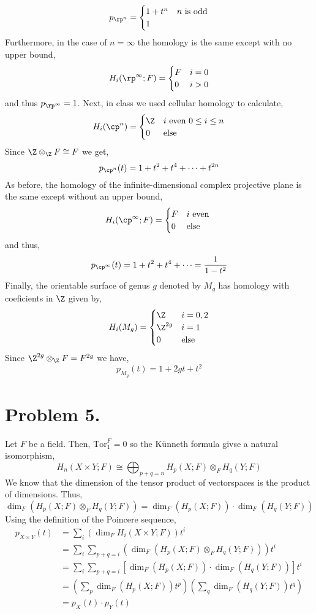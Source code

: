 \documentclass[12pt]{extarticle}
\begin{document}
\[ p_{\rp^n} = 
\begin{cases}
1 + t^n & n \text{ is odd}
\\
1
\end{cases}\]
Furthermore, in the case of $n = \infty$ the homology is the same except with no upper bound,
\[ H_i(\rp^\infty ; F) = 
\begin{cases}
F & i = 0
\\
0 & i > 0
\end{cases}
\]
and thus $p_{\rp^{\infty}} = 1$.
Next, in class we used cellular homology to calculate,
\[ H_i(\cp^n) = 
\begin{cases}
\Z & i \text{ even } 0 \le i \le n
\\
0 & \text{else}
\end{cases}
\]
Since $\Z \otimes_{\Z} F \cong F$ we  get,
\[ p_{\cp^n}(t) = 1 + t^2 + t^4 + \cdots + t^{2n} \]
As before, the homology of the infinite-dimensional complex projective plane is the same except without an upper bound, 
\[ H_i(\cp^\infty ; F) = 
\begin{cases}
F & i \text{ even }
\\
0 & \text{else}
\end{cases}
\]
and thus, 
\[ p_{\cp^\infty}(t) = 1 + t^2 + t^4 + \cdots = \frac{1}{1 - t^2} \]
Finally, the orientable surface of genus $g$ denoted by $M_g$ has homology with coeficients in $\Z$ given by,
\[ H_i(M_g) = 
\begin{cases}
\Z & i = 0,2
\\
\Z^{2g} & i = 1
\\
0 & \text{else}
\end{cases}
\]
Since $\Z^{2g} \otimes_{\Z} F = F^{2g}$ we have,
\[ p_{M_g}(t) = 1 + 2g t + t^2 \]   

\section*{Problem 5.}

Let $F$ be a field. Then, $\mathrm{Tor}^F_1 = 0$ so the K\"{u}nneth formula givse a natural isomorphism,
\[ H_n(X \times Y ; F) \cong \bigoplus_{p + q = n} H_p(X ; F) \otimes_F H_q(Y ; F) \]
We know that the dimension of the tensor product of vectorspaces is the product of dimensions. Thus, 
\[\dim_{F} \left( H_p(X ; F) \otimes_F H_q(Y ; F) \right) = \dim_{F} \left( H_p(X ; F) \right) \cdot \dim_{F} \left( H_q(Y ; F) \right) \]
Using the definition of the Poincere sequence,
\begin{align*}
p_{X \times Y}(t) & = \sum_{i} \left( \dim_F{H_i(X \times Y ; F)} \right) t^i
\\
& = \sum_{i} \sum_{p + q = i} \left( \dim_{F} \left( H_p(X ; F) \otimes_F H_q(Y ; F) \right) \right) t^i
\\
& = \sum_{i} \sum_{p + q = i} \left[ \dim_{F} \left( H_p(X ; F) \right) \cdot \dim_{F} \left( H_q(Y ; F) \right) \right] t^i
\\
& = \left( \sum_{p} \dim_{F} \left( H_p(X ; F) \right) t^p \right) \left( \sum_{q} \dim_{F} \left( H_q(Y ; F) \right) t^q \right)
\\
& = p_X(t) \cdot p_Y(t)
\end{align*}
\end{document}
